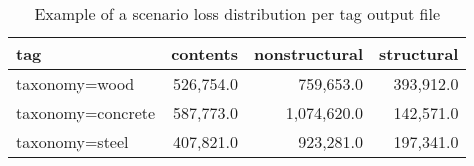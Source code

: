 \begin{table}[htbp]
\centering
\begin{tabular}{lrrr}
\hline
\rowcolor{lightgray}
\textbf{tag} & \textbf{contents} & \textbf{nonstructural} & \textbf{structural} \\ \hline
taxonomy=wood & 526,754.0 & 759,653.0 & 393,912.0 \\
taxonomy=concrete & 587,773.0 & 1,074,620.0 & 142,571.0 \\
taxonomy=steel & 407,821.0 & 923,281.0 & 197,341.0 \\
\hline
\end{tabular}
\caption{Example of a scenario loss distribution per tag output file}
\label{output:scenario_loss_tag}
\end{table}

